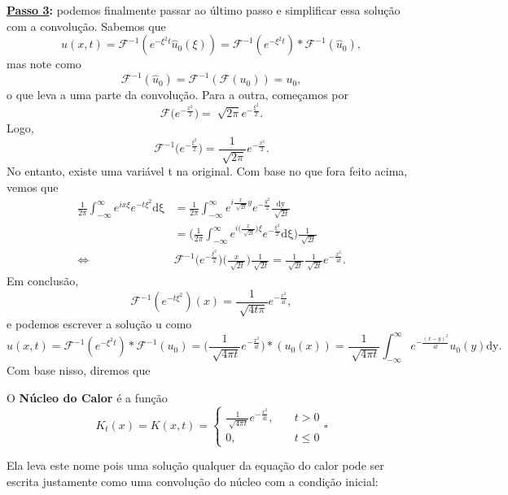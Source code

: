 \documentclass[../pde_notes.tex]{subfiles}
\begin{document}
\textbf{\underline{Passo 3}:} podemos finalmente passar ao último passo e simplificar essa solução com a convolução. Sabemos que
\[
	u(x, t) = \mathcal{F}^{-1}(e^{-\xi^{2}t}\hat{u}_{0}(\xi )) = \mathcal{F}^{-1}(e^{-\xi^{2}t})*\mathcal{F}^{-1}(\hat{u}_{0}),
\]
mas note como
\[
	\mathcal{F}^{-1}(\hat{u}_{0}) = \mathcal{F}^{-1}(\mathcal{F}(u_{0})) = u_{0},
\]
o que leva a uma parte da convolução. Para a outra, começamos por
\[
	\mathcal{F}\biggl(e^{-\frac{x^{2}}{2}}\biggr) = \sqrt[]{2\pi }e^{-\frac{\xi^{2}}{2}}.
\]
Logo,
\[
	\mathcal{F}^{-1}\biggl(e^{-\frac{\xi^{2}}{2}}\biggr) = \frac{1}{\sqrt[]{2\pi }}e^{-\frac{x^{2}}{2}}.
\]
No entanto, existe uma variável t na original. Com base no que fora feito acima, vemos que
\begin{align*}
	\frac{1}{2\pi }\int_{-\infty}^{\infty}e^{ix\xi }e^{-t\xi^{2}} \mathrm{d\xi } & = \frac{1}{2\pi }\int_{-\infty}^{\infty}e^{i \frac{x}{\sqrt[]{2t}}y}e^{-\frac{y^{2}}{2}} \frac{\mathrm{dy}}{\sqrt[]{2t}}                                                        \\
	                                                                             & = \biggl(\frac{1}{2\pi }\int_{-\infty}^{\infty}e^{i \biggl(\frac{x}{\sqrt[]{2t}}\biggr)\xi }e^{-\frac{\xi^{2}}{2}} \mathrm{d\xi }\biggr)\frac{1}{\sqrt[]{2t}}                   \\
	\Longleftrightarrow                                                          & \mathcal{F}^{-1}\biggl(e^{-\frac{\xi^{2}}{2}}\biggr)\biggl(\frac{x}{\sqrt[]{2t}}\biggr)\frac{1}{\sqrt[]{2t}} = \frac{1}{\sqrt[]{2t}}\frac{1}{\sqrt[]{2t}}e^{-\frac{x^{2}}{4t}}.
\end{align*}
Em conclusão,
\[
	\mathcal{F}^{-1}(e^{-t\xi^{2}})(x) = \frac{1}{\sqrt[]{4t\pi }}e^{-\frac{x^{2}}{4t}},
\]
e podemos escrever a solução u como
\[
	u(x, t) = \mathcal{F}^{-1}(e^{-\xi^{2}t})*\mathcal{F}^{-1}(u_{0}) = \biggl(\frac{1}{\sqrt[]{4\pi t}}e^{-\frac{x^{2}}{4t}}\biggr)*(u_{0}(x)) = \frac{1}{\sqrt[]{4\pi t}}\int_{-\infty}^{\infty}e^{-\frac{(x-y)^{2}}{4t}}u_{0}(y) \mathrm{dy}.
\]
Com base nisso, diremos que
\begin{def*}
	O \textbf{Núcleo do Calor} é a função
	\[
		K_t(x) = K(x, t)  = \left\{\begin{array}{ll}
			\frac{1}{\sqrt[]{4\pi t}}e^{-\frac{x^{2}}{4t}}, & \quad t>0     \\
			0,                                              & \quad t\leq 0
		\end{array}\right. \square
	\]
\end{def*}
Ela leva este nome pois uma solução qualquer da equação do calor pode ser escrita justamente como uma convolução do núcleo com a condição inicial:
\end{document}
